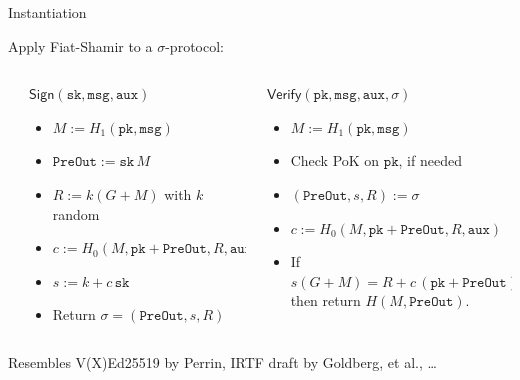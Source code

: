 \documentclass[fleqn,xcolor={usenames,dvipsnames},notes,aspectratio=169]{beamer} %
\newcommand{\algo}[1]{\ensuremath{\mathsf{#1}}}
\newcommand{\Sign}{\algo{Sign}}
\newcommand{\Verify}{\algo{Verify}}
\newcommand{\var}[1]{\ensuremath{\mathtt{#1}}}
\newcommand{\sk}{\var{sk}}
\newcommand{\pk}{\var{pk}}
\newcommand{\msg}{\var{msg}}
\newcommand{\aux}{\var{aux}}
\newcommand{\In}{\ensuremath{M}}
\newcommand{\PreOut}{\var{PreOut}}
\begin{document}
\begin{frame}{Instantiation}

\medskip

Apply Fiat-Shamir to a $\sigma$-protocol:

\medskip 

\begin{columns}
\begin{column}[t]{0.05\textwidth}
\end{column}
\begin{column}[t]{0.475\textwidth}
    {\em $\Sign(\sk,\msg,\aux)$} \\
    \begin{itemize}
    \item $\In := H_1(\pk,\msg)$
    \item $\PreOut := \sk \, \In$
    \item $R := k (G + \In)$ with $k$ random
    \item $c := H_0(\In, \pk + \PreOut, R, \aux)$
    \item $s := k + c \, \sk$
    \item Return $\sigma = (\PreOut,s,R)$
    \end{itemize}
\end{column}
\begin{column}[t]{0.475\textwidth}
    {\em $\Verify(\pk,\msg,\aux,\sigma)$} \\
    \begin{itemize}
    \item $\In := H_1(\pk,\msg)$
    \item Check PoK on \pk, if needed
    \item $(\PreOut,s,R) := \sigma$
    \item $c := H_0(\In, \pk + \PreOut, R, \aux)$
    \item If $s (G + \In) = R + c \, (\pk + \PreOut)$ \\ then return $H(\In,\PreOut)$.
    \end{itemize}
\end{column}
\end{columns}

\bigskip

Resembles {V(X)Ed25519} by Perrin, IRTF draft by Goldberg, et al., \ldots

\end{frame}
\end{document}
